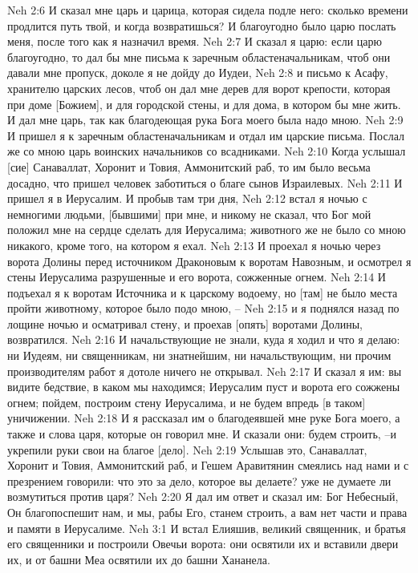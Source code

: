 Neh 2:6  И сказал мне царь и царица, которая сидела подле него: сколько времени продлится путь твой, и когда возвратишься? И благоугодно было царю послать меня, после того как я назначил время.
Neh 2:7  И сказал я царю: если царю благоугодно, то дал бы мне письма к заречным областеначальникам, чтоб они давали мне пропуск, доколе я не дойду до Иудеи,
Neh 2:8  и письмо к Асафу, хранителю царских лесов, чтоб он дал мне дерев для ворот крепости, которая при доме [Божием], и для городской стены, и для дома, в котором бы мне жить. И дал мне царь, так как благодеющая рука Бога моего была надо мною.
Neh 2:9  И пришел я к заречным областеначальникам и отдал им царские письма. Послал же со мною царь воинских начальников со всадниками.
Neh 2:10  Когда услышал [сие] Санаваллат, Хоронит и Товия, Аммонитский раб, то им было весьма досадно, что пришел человек заботиться о благе сынов Израилевых.
Neh 2:11  И пришел я в Иерусалим. И пробыв там три дня,
Neh 2:12  встал я ночью с немногими людьми, [бывшими] при мне, и никому не сказал, что Бог мой положил мне на сердце сделать для Иерусалима; животного же не было со мною никакого, кроме того, на котором я ехал.
Neh 2:13  И проехал я ночью через ворота Долины перед источником Драконовым к воротам Навозным, и осмотрел я стены Иерусалима разрушенные и его ворота, сожженные огнем.
Neh 2:14  И подъехал я к воротам Источника и к царскому водоему, но [там] не было места пройти животному, которое было подо мною, --
Neh 2:15  и я поднялся назад по лощине ночью и осматривал стену, и проехав [опять] воротами Долины, возвратился.
Neh 2:16  И начальствующие не знали, куда я ходил и что я делаю: ни Иудеям, ни священникам, ни знатнейшим, ни начальствующим, ни прочим производителям работ я дотоле ничего не открывал.
Neh 2:17  И сказал я им: вы видите бедствие, в каком мы находимся; Иерусалим пуст и ворота его сожжены огнем; пойдем, построим стену Иерусалима, и не будем впредь [в таком] уничижении.
Neh 2:18  И я рассказал им о благодеявшей мне руке Бога моего, а также и слова царя, которые он говорил мне. И сказали они: будем строить, --и укрепили руки свои на благое [дело].
Neh 2:19  Услышав это, Санаваллат, Хоронит и Товия, Аммонитский раб, и Гешем Аравитянин смеялись над нами и с презрением говорили: что это за дело, которое вы делаете? уже не думаете ли возмутиться против царя?
Neh 2:20  Я дал им ответ и сказал им: Бог Небесный, Он благопоспешит нам, и мы, рабы Его, станем строить, а вам нет части и права и памяти в Иерусалиме.
Neh 3:1  И встал Елияшив, великий священник, и братья его священники и построили Овечьи ворота: они освятили их и вставили двери их, и от башни Меа освятили их до башни Хананела.
